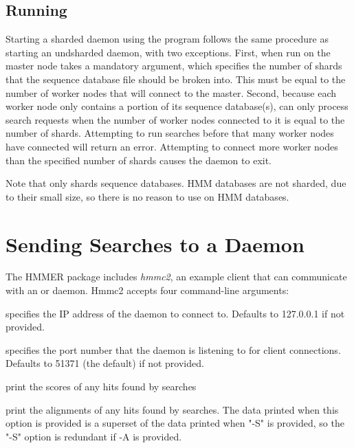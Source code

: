 \documentclass[notoc,justified]{tufte-book}    %
\begin{document}
\subsection{Running }
Starting a sharded daemon using the  program follows the same procedure as starting an undsharded daemon, with two exceptions.  First, when run on the master node  takes a mandatory  argument, which specifies the number of shards that the sequence database file should be broken into.  This must be equal to the number of worker nodes that will connect to the master.  Second, because each worker node only contains a portion of its sequence database(s),  can only process search requests when the number of worker nodes connected to it is equal to the number of shards.  Attempting to run searches before that many worker nodes have connected will return an error.  Attempting to connect more worker nodes than the specified number of shards causes the daemon to exit.

Note that  only shards sequence databases.  HMM databases are not sharded, due to their small size, so there is no reason to use  on HMM databases. 


\section{Sending Searches to a Daemon}
The HMMER package includes {\em hmmc2}, an example client that can communicate with an  or  daemon.  Hmmc2 accepts four command-line arguments:

\begin{sreitems}{}
  \item[\monob{-i <IP address>}] specifies the IP address of the daemon to connect to.  Defaults to 127.0.0.1 if not provided.
  \item[\monob{-p <port>}] specifies the port number that the daemon is listening to for client connections.  Defaults to 51371 (the  default) if not provided.
  \item[\monob{-S}] print the scores of any hits found by searches
  \item[\monob{-A}] print the alignments of any hits found by searches.  The data printed when this option is provided is a superset of the data printed when "-S" is provided, so the "-S" option is redundant if -A is provided.
\end{sreitems}
\end{document}
